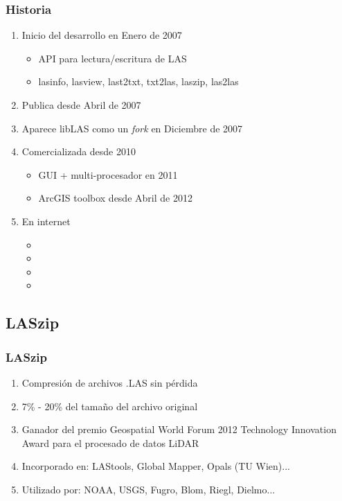 \begin{frame}
  \frametitle{Historia}
  \begin{enumerate}
    \item Inicio del desarrollo en Enero de 2007
      \begin{itemize}
        \item API para lectura/escritura de LAS
        \item lasinfo, lasview, last2txt, txt2las, laszip, las2las
      \end{itemize}
    \item Publica desde Abril de 2007
    \item Aparece libLAS como un \emph{fork} en Diciembre de 2007
    \item Comercializada desde 2010
      \begin{itemize}
        \item GUI + multi-procesador en 2011
        \item ArcGIS toolbox desde Abril de 2012
      \end{itemize}
    \item En internet
      \begin{itemize}
        \item {}
        \item {}
        \item {}
        \item {}
      \end{itemize}
  \end{enumerate}
\end{frame}
\subsection{LASzip}
\begin{frame}
  \frametitle{LASzip}
  \begin{enumerate}
    \item Compresión de archivos .LAS sin \alert{pérdida}
    \item 7\% - 20\% del tamaño del archivo original
    \item Ganador del premio Geospatial World Forum 2012 Technology 
      Innovation Award para el procesado de datos LiDAR
    \item Incorporado en: LAStools, Global Mapper, Opals (TU Wien)...
    \item Utilizado por: NOAA, USGS, Fugro, Blom, Riegl, Dielmo...
    \laszip
  \end{enumerate}
\end{frame}
